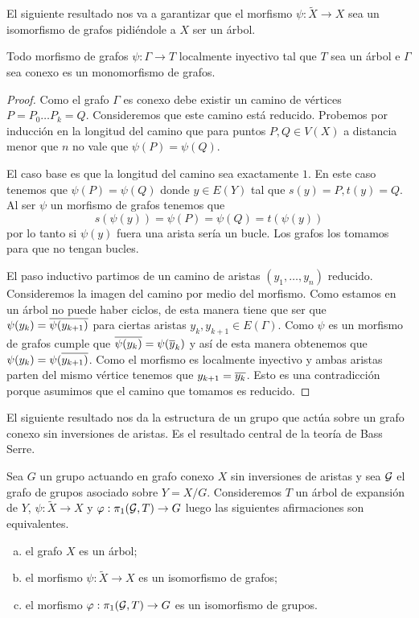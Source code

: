 \documentclass[tesis.tex]{subfiles}
\newcommand{\Xm}{\widetilde X}
\begin{document}
El siguiente resultado nos va a garantizar que el morfismo $\psi: \Xm \to X$ sea un isomorfismo de grafos pidiéndole a $X$ ser un árbol.

\begin{prop}\label{prop_loc_iny}
	Todo morfismo de grafos $\psi:\Gamma \to T$ localmente inyectivo tal que $T$ sea un árbol e $\Gamma$ sea conexo es un monomorfismo de grafos.    
\end{prop}
\begin{proof}
	Como el grafo $\Gamma$ es conexo debe existir un camino de vértices $P=P_0 \dots P_k=Q$.
	Consideremos que este camino está reducido.
	Probemos por inducción en la longitud del camino que para puntos $P,Q \in V(X)$ a distancia menor que $n$ no vale que $\psi(P) = \psi(Q)$.
	
	El caso base es que la longitud del camino sea exactamente $1$.
	En este caso tenemos que $\psi(P) = \psi(Q)$ donde $y \in E(Y)$ tal que $s(y)= P, t(y) = Q$.
	Al ser $\psi$ un morfismo de grafos tenemos que 
	\begin{equation*}
		s(\psi(y)) = \psi(P) = \psi (Q) = t(\psi(y))
	\end{equation*}
	por lo tanto si $\psi(y)$ fuera una arista sería un bucle.
	Los grafos los tomamos para que no tengan bucles.
	
	El paso inductivo partimos de un camino de aristas $(y_1, \dots, y_n)$ reducido.
	Consideremos la imagen del camino por medio del morfismo.
	Como estamos en un árbol no puede haber ciclos, de esta manera tiene que ser que $\psi(y_k) = \overline{\psi (y_{k+1})}$ para ciertas aristas $y_k, y_{k+1} \in E(\Gamma)$.
	Como $\psi$ es un morfismo de grafos cumple que $\overline {\psi(y_k)} = \psi(\overline y_k)$ y así de esta manera obtenemos que $\psi(y_k) =  \psi(\overline{y_{k+1})}$.
	Como el morfismo es localmente inyectivo y ambas aristas parten del mismo vértice tenemos que $y_{k+1} = \overline{y_k}$. Esto es una contradicción porque asumimos que el camino que tomamos es reducido.    
\end{proof}

El siguiente resultado nos da la estructura de un grupo que actúa sobre un grafo conexo sin inversiones de aristas. 
Es el resultado central de la teoría de Bass Serre.

\begin{teo}\label{teo_Serre}
	Sea $G$ un grupo actuando en grafo conexo $X$ sin inversiones de aristas y sea $\cal G$ el grafo de grupos asociado sobre $Y = X / G$.
	Consideremos $T$ un árbol de expansión de $Y$, $\psi: \Xm \to X$ y $\varphi: \pi_1({\cal G}, T) \to G$ luego las siguientes afirmaciones son equivalentes.
	\begin{enumerate}[(a)]
		\item el grafo $X$ es un árbol;
		\item el morfismo $\psi: \Xm \to X$ es un isomorfismo de grafos;
		\item el morfismo $\varphi:\pi_1({\cal G}, T) \to G$ es un isomorfismo de grupos.
	\end{enumerate}
\end{teo}
\end{document}
